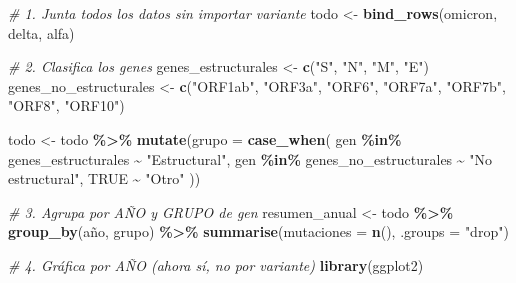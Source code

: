 \documentclass[
]{article}
\newenvironment{Shaded}{\begin{snugshade}}{\end{snugshade}}
\newcommand{\AttributeTok}[1]{\textcolor[rgb]{0.13,0.29,0.53}{#1}}
\newcommand{\CommentTok}[1]{\textcolor[rgb]{0.56,0.35,0.01}{\textit{#1}}}
\newcommand{\ConstantTok}[1]{\textcolor[rgb]{0.56,0.35,0.01}{#1}}
\newcommand{\FunctionTok}[1]{\textcolor[rgb]{0.13,0.29,0.53}{\textbf{#1}}}
\newcommand{\NormalTok}[1]{#1}
\newcommand{\OtherTok}[1]{\textcolor[rgb]{0.56,0.35,0.01}{#1}}
\newcommand{\SpecialCharTok}[1]{\textcolor[rgb]{0.81,0.36,0.00}{\textbf{#1}}}
\newcommand{\StringTok}[1]{\textcolor[rgb]{0.31,0.60,0.02}{#1}}
\begin{document}
\begin{Shaded}
\begin{Highlighting}[]
\CommentTok{\# 1. Junta todos los datos sin importar variante}
\NormalTok{todo }\OtherTok{\textless{}{-}} \FunctionTok{bind\_rows}\NormalTok{(omicron, delta, alfa)}

\CommentTok{\# 2. Clasifica los genes}
\NormalTok{genes\_estructurales }\OtherTok{\textless{}{-}} \FunctionTok{c}\NormalTok{(}\StringTok{"S"}\NormalTok{, }\StringTok{"N"}\NormalTok{, }\StringTok{"M"}\NormalTok{, }\StringTok{"E"}\NormalTok{)}
\NormalTok{genes\_no\_estructurales }\OtherTok{\textless{}{-}} \FunctionTok{c}\NormalTok{(}\StringTok{"ORF1ab"}\NormalTok{, }\StringTok{"ORF3a"}\NormalTok{, }\StringTok{"ORF6"}\NormalTok{, }\StringTok{"ORF7a"}\NormalTok{, }\StringTok{"ORF7b"}\NormalTok{, }\StringTok{"ORF8"}\NormalTok{, }\StringTok{"ORF10"}\NormalTok{)}

\NormalTok{todo }\OtherTok{\textless{}{-}}\NormalTok{ todo }\SpecialCharTok{\%\textgreater{}\%}
  \FunctionTok{mutate}\NormalTok{(}\AttributeTok{grupo =} \FunctionTok{case\_when}\NormalTok{(}
\NormalTok{    gen }\SpecialCharTok{\%in\%}\NormalTok{ genes\_estructurales }\SpecialCharTok{\textasciitilde{}} \StringTok{"Estructural"}\NormalTok{,}
\NormalTok{    gen }\SpecialCharTok{\%in\%}\NormalTok{ genes\_no\_estructurales }\SpecialCharTok{\textasciitilde{}} \StringTok{"No estructural"}\NormalTok{,}
    \ConstantTok{TRUE} \SpecialCharTok{\textasciitilde{}} \StringTok{"Otro"}
\NormalTok{  ))}

\CommentTok{\# 3. Agrupa por AÑO y GRUPO de gen}
\NormalTok{resumen\_anual }\OtherTok{\textless{}{-}}\NormalTok{ todo }\SpecialCharTok{\%\textgreater{}\%}
  \FunctionTok{group\_by}\NormalTok{(año, grupo) }\SpecialCharTok{\%\textgreater{}\%}
  \FunctionTok{summarise}\NormalTok{(}\AttributeTok{mutaciones =} \FunctionTok{n}\NormalTok{(), }\AttributeTok{.groups =} \StringTok{"drop"}\NormalTok{)}

\CommentTok{\# 4. Gráfica por AÑO (ahora sí, no por variante)}
\FunctionTok{library}\NormalTok{(ggplot2)}


\end{Highlighting}
\end{Shaded}
\end{document}
